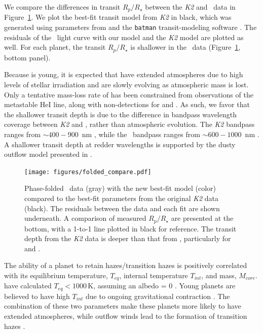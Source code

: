 \documentclass[twocolumn]{aastex631}
\begin{document}
We compare the differences in transit $R_p/R_\star$ between the \textit{K2} and \tess\ data in Figure~\ref{fig:compare}. We plot the best-fit transit model from \textit{K2} in black, which was generated using parameters from \cite{David2019a} and the \texttt{batman} transit-modeling software \citep{Kreidberg15}. The residuals of the \tess\ light curve with our model and the \textit{K2} model are plotted as well. For each planet, the transit $R_p/R_\star$ is shallower in the \tess\ data (Figure~\ref{fig:compare}, bottom panel).

Because \sname is young, it is expected that \allplanets have extended atmospheres due to high levels of stellar irradiation \citep{OwenWu2017} and are slowly evolving as atmospheric mass is lost. Only a tentative mass-loss rate of \planetd has been constrained from observations of the metastable He\textsc{I} line, along with non-detections for \planetb and \planetc \citep{Vissapragada21}. As such, we favor that the shallower transit depth is due to the difference in bandpass wavelength coverage between \textit{K2} and \tess, rather than atmospheric evolution. The \textit{K2} bandpass ranges from $\sim 400-900$~nm \citep{Howell2014}, while the \tess\ bandpass ranges from $\sim 600-1000$~nm \citep{Ricker2015}. A shallower transit depth at redder wavelengths is supported by the dusty outflow model presented in \citep{wang19}.

\begin{figure}[!ht]
\begin{center}
\texttt{[image: figures/folded\_compare.pdf]}
\caption{Phase-folded \tess\ data (gray) with the new best-fit model (color) compared to the best-fit parameters from the original \textit{K2} data (black). The residuals between the data and each fit are shown underneath. A comparison of measured $R_p/R_\star$ are presented at the bottom, with a 1-to-1 line plotted in black for reference. The transit depth from the \textit{K2} data is deeper than that from \tess, particularly for \planetb and \planete.} \label{fig:compare}
\end{center}
\end{figure}

The ability of a planet to retain hazes/transition hazes is positively correlated with its equilibrium temperature, $T_{eq}$, internal temperature $T_{int}$, and mass, $M_{core}$. \allplanets have calculated $T_{eq}<1000$\,K, assuming an albedo = 0 \citep{David2019a}. Young planets are believed to have high $T_{int}$ due to ongoing gravitational contraction \citep{gu04}. The combination of these two parameters make these planets more likely to have extended atmospheres, while outflow winds lead to the formation of transition hazes \citep{gao20}. 
\end{document}
